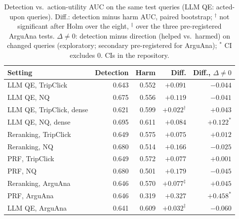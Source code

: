 \begin{table}[t]
\caption{Detection vs.\ action-utility AUC on the same test queries
(LLM QE: acted-upon queries). Diff.: detection minus harm AUC, paired
bootstrap; $^\dagger$ not significant after Holm over the eight,
$^\ddagger$ over the three pre-registered ArguAna tests. $\Delta\neq0$:
detection minus direction (helped vs.\ harmed) on changed queries
(exploratory; secondary pre-registered for ArguAna); $^*$ CI excludes
0. CIs in the repository.}
\label{tab:auc}
\footnotesize
\setlength{\tabcolsep}{3pt}
\begin{tabular}{@{}lrrrr@{}}
\toprule
Setting & Detection & Harm & Diff. & Diff., $\Delta\neq0$ \\
\midrule
LLM QE, TripClick & 0.643 & 0.552 & $+0.091$ & $-0.044$ \\
LLM QE, NQ & 0.675 & 0.556 & $+0.119$ & $-0.041$ \\
LLM QE, TripClick, dense & 0.621 & 0.599 & $+0.022^\dagger$ & $+0.043$ \\
LLM QE, NQ, dense & 0.695 & 0.611 & $+0.084$ & $+0.122^*$ \\
Reranking, TripClick & 0.649 & 0.575 & $+0.075$ & $+0.012$ \\
Reranking, NQ & 0.680 & 0.514 & $+0.166$ & $-0.025$ \\
PRF, TripClick & 0.649 & 0.572 & $+0.077$ & $+0.001$ \\
PRF, NQ & 0.680 & 0.501 & $+0.179$ & $-0.045$ \\
\midrule
Reranking, ArguAna & 0.646 & 0.570 & $+0.077^\ddagger$ & $+0.045$ \\
PRF, ArguAna & 0.646 & 0.319 & $+0.327$ & $+0.458^*$ \\
LLM QE, ArguAna & 0.641 & 0.609 & $+0.032^\ddagger$ & $-0.060$ \\
\bottomrule
\end{tabular}
\end{table}
